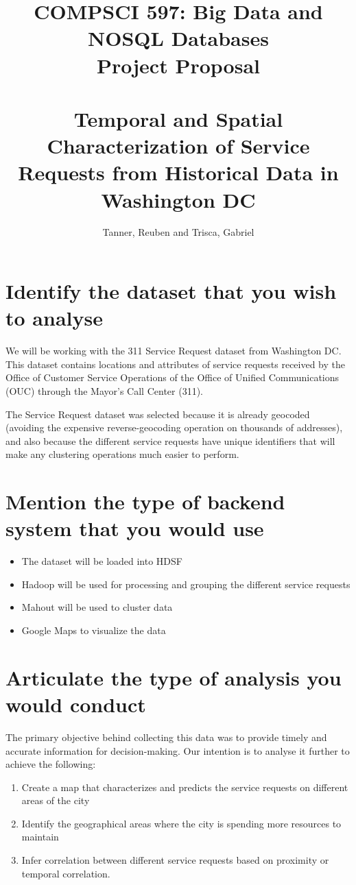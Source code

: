 \documentclass[a4paper,10pt]{article}
\title{{\large{COMPSCI 597: Big Data and NOSQL Databases}}\\\Large{Project Proposal}\\\hfill\\ Temporal and Spatial Characterization of Service Requests from Historical Data in Washington DC}
\author{Tanner, Reuben and Trisca, Gabriel}
\begin{document}
\maketitle

\section{Identify the dataset that you wish to analyse}
We will be working with the 311 Service Request dataset from Washington DC.
This dataset contains locations and attributes of service requests received by the Office of Customer Service Operations of the Office of Unified Communications (OUC) through the Mayor's Call Center (311)\cite{DatasetDocumentation}.

The Service Request dataset was selected because it is already geocoded (avoiding the expensive reverse-geocoding operation on thousands of addresses), and also because the different service requests have unique identifiers that will make any clustering operations much easier to perform.

\section{Mention the type of backend system that you would use}
\begin{itemize}
\item The dataset will be loaded into HDSF
\item Hadoop will be used for processing and grouping the different service requests
\item Mahout will be used to cluster data 
\item Google Maps to visualize the data
\end{itemize}

\section{Articulate the type of analysis you would conduct}
The primary objective behind collecting this data was to provide timely and accurate information for decision-making\cite{DatasetDocumentation}. Our intention is to analyse it further to achieve the following:

\begin{enumerate}
\item Create a map that characterizes and predicts the service requests on different areas of the city
\item Identify the geographical areas where the city is spending more resources to maintain
\item Infer correlation between different service requests based on proximity or temporal correlation.
\end{enumerate}
\end{document}
